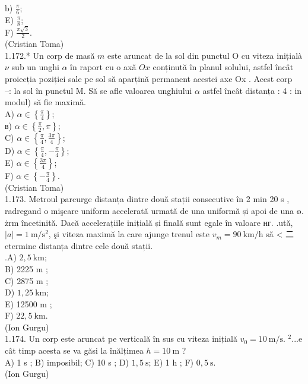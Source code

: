 \documentclass[10pt]{article}
\begin{document}
b) $\frac{\pi}{6}$;\\
E) $\frac{\pi}{8}$;\\
F) $\frac{\pi \sqrt{3}}{2}$.\\
(Cristian Toma)\\
1.172.* Un corp de masă $m$ este aruncat de la sol din punctul O cu viteza inițialà $\nu$ sub un unghi $\alpha$ în raport cu o axă $O x$ conținută în planul solului, astfel încât proiecția poziției sale pe sol să aparțină permanent acestei axe Ox . Acest corp\\
--: la sol în punctul M. Să se afle valoarea unghiului $\alpha$ astfel încât distanța : 4 : in modul) să fie maximă.\\
A) $\alpha \in\left\{\frac{\pi}{4}\right\} ;$\\
в) $\alpha \in\left\{\frac{\pi}{2}, \pi\right\}$;\\
C) $\alpha \in\left\{\frac{\pi}{4}, \frac{3 \pi}{4}\right\}$;\\
D) $\alpha \in\left\{\frac{\pi}{4},-\frac{\pi}{4}\right\}$;\\
E) $\alpha \in\left\{\frac{3 \pi}{4}\right\}$;\\
F) $\alpha \in\left\{-\frac{\pi}{4}\right\}$.\\
(Cristian Toma)\\
1.173. Metroul parcurge distanța dintre două stații consecutive în 2 min 20 s , radregand o mişcare uniform accelerată urmată de una uniformă și apoi de una ๓. żrm încetinită. Dacă accelerațiile inițială și finală sunt egale în valoare нг. .ută, $|a|=1 \mathrm{~m} / \mathrm{s}^{2}$, şi viteza maximă la care ajunge trenul este $v_{m}=90 \mathrm{~km} / \mathrm{h}$ să < 二etermine distanța dintre cele două stații.\\
.A) $2,5 \mathrm{~km}$;\\
B) 2225 m ;\\
C) 2875 m ;\\
D) $1,25 \mathrm{~km}$;\\
E) 12500 m ;\\
F) $22,5 \mathrm{~km}$.\\
(Ion Gurgu)\\
1.174. Un corp este aruncat pe verticală în sus cu viteza inițială $v_{0}=10 \mathrm{~m} / \mathrm{s}$. ${ }^{2}$...e cât timp acesta se va găsi la înălțimea $h=10 \mathrm{~m}$ ?\\
A) 1 s ; B) imposibil; C) 10 s ; D) $1,5 \mathrm{~s}$; E) 1 h ; F) $0,5 \mathrm{~s}$.\\
(Ion Gurgu)\\
\end{document}
